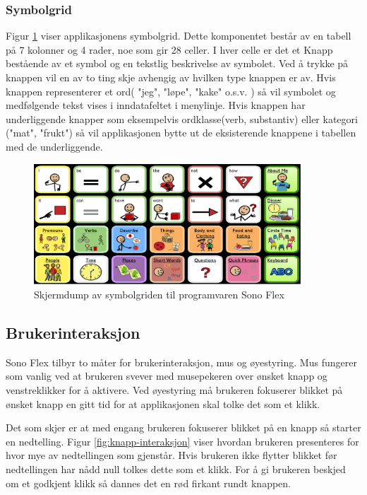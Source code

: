 \documentclass[phd,tocprelim]{cornell}
\begin{document}
\subsubsection{Symbolgrid}

Figur \ref{fig:symbolgrid} viser applikasjonens symbolgrid. Dette komponentet består av en tabell på 7 kolonner og 4 rader,  noe som gir 28 celler. I hver celle er det et Knapp bestående av et symbol og en tekstlig beskrivelse av symbolet. Ved å trykke på knappen vil en av to ting skje avhengig av hvilken type knappen er av. Hvis knappen representerer et ord( "jeg",  "løpe",  "kake" o.s.v. ) så vil symbolet og medfølgende tekst vises i inndatafeltet i menylinje.  Hvis knappen har underliggende knapper som eksempelvis ordklasse(verb,  substantiv)  eller kategori ("mat",  "frukt") så vil applikasjonen bytte ut de eksisterende knappene i tabellen med de underliggende. 


\begin{figure}[ht!]
\centering
\includegraphics[width=100mm]{symbolgrid}
\caption{Skjermdump av symbolgriden til programvaren Sono Flex}
\label{fig:symbolgrid}
\end{figure}


\subsection{Brukerinteraksjon}

Sono Flex tilbyr to måter for brukerinteraksjon,  mus og øyestyring. Mus fungerer som vanlig ved at brukeren svever med musepekeren over ønsket knapp og venstreklikker for å aktivere. Ved øyestyring må brukeren fokuserer blikket på ønsket knapp en gitt tid for at applikasjonen skal tolke det som et klikk. 

Det som skjer er at med engang brukeren fokuserer blikket på en knapp så starter en nedtelling. Figur \ref{fig:knapp-interaksjon} viser hvordan brukeren presenteres for hvor mye av nedtellingen som gjenstår.  Hvis brukeren ikke flytter blikket før nedtellingen har nådd null tolkes dette som et klikk.
For å gi brukeren beskjed om et godkjent klikk så dannes det en rød firkant rundt knappen. 
\end{document}
